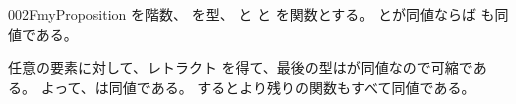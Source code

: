 \documentclass[index]{subfiles}
\begin{document}
\begin{myBlock}{002F}{myProposition}
  を階数、
  を型、
  と
  と
  を関数とする。
  とが同値ならば
  も同値である。
\end{myBlock}
\StartDefiningTabulars
\begin{myProof}
  任意の要素に対して、レトラクト
  を得て、最後の型はが同値なので可縮である。
  よって、は同値である。
  するとより残りの関数もすべて同値である。
\end{myProof}
\StopDefiningTabulars
\end{document}
